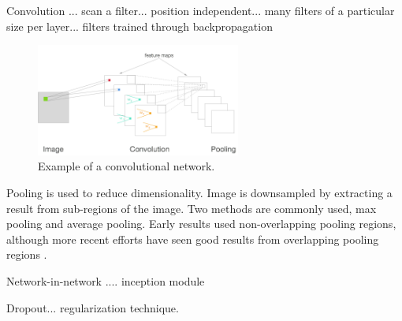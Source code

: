 Convolution\cite{lecun1995comparison,lecun2010convolutional,krizhevsky2012imagenet} ... scan a filter... position independent... many filters of a particular size per layer... filters trained through backpropagation 


\begin{figure}[t]
  \begin{center}
    \includegraphics[width=0.6\textwidth]{figures/figures/convnet.png}
  \end{center}
  \caption[Example of a convolutional network ]{Example of a convolutional network.}

  \label{convnet}
\end{figure}



Pooling is used to reduce dimensionality. \cite{lecun2010convolutional} Image is downsampled by extracting a result from sub-regions of the image.  Two methods are commonly used, max pooling and average pooling.  Early results used non-overlapping pooling regions, although more recent efforts have seen good results from overlapping pooling regions \cite{krizhevsky2012imagenet}.  




Network-in-network\cite{lin2013network} .... inception module \cite{szegedy2014going}

Dropout... regularization technique. \cite{hinton2014dropout}




